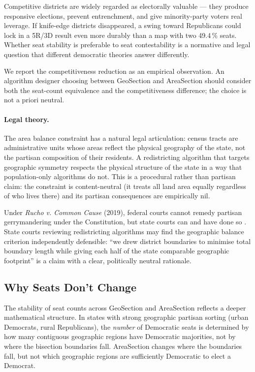 Competitive districts are widely regarded as electorally valuable --- they
produce responsive elections, prevent entrenchment, and give minority-party
voters real leverage.
If knife-edge districts disappeared, a swing toward Republicans could lock in
a 5R/3D result even more durably than a map with two 49.4\,\% seats.
Whether seat stability is preferable to seat contestability is a normative and
legal question that different democratic theories answer differently.

We report the competitiveness reduction as an empirical observation.
An algorithm designer choosing between GeoSection and AreaSection should
consider both the seat-count equivalence and the competitiveness difference;
the choice is not a priori neutral.

\paragraph{Legal theory.}
The area balance constraint has a natural legal articulation:
census tracts are administrative units whose areas reflect the physical
geography of the state, not the partisan composition of their residents.
A redistricting algorithm that targets geographic symmetry respects the
physical structure of the state in a way that population-only algorithms
do not.
This is a procedural rather than partisan claim: the constraint is
content-neutral (it treats all land area equally regardless of who lives there)
and its partisan consequences are empirically nil.

Under \emph{Rucho v. Common Cause} (2019), federal courts cannot remedy
partisan gerrymandering under the Constitution, but state courts can and
have done so \citep{lwv2018pa,harper2022nc}.
State courts reviewing redistricting algorithms may find the geographic
balance criterion independently defensible:
``we drew district boundaries to minimise total boundary length while
giving each half of the state comparable geographic footprint''
is a claim with a clear, politically neutral rationale.

\subsection{Why Seats Don't Change}
\label{sec:why-seats-stable}

The stability of seat counts across GeoSection and AreaSection reflects
a deeper mathematical structure.
In states with strong geographic partisan sorting (urban Democrats,
rural Republicans), the \emph{number} of Democratic seats is determined
by how many contiguous geographic regions have Democratic majorities,
not by where the bisection boundaries fall.
AreaSection changes where the boundaries fall, but not which geographic
regions are sufficiently Democratic to elect a Democrat.


